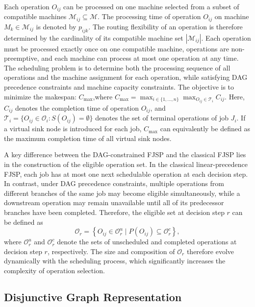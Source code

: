 Each operation $O_{ij}$ can be processed on one machine selected from a subset of compatible machines $\mathcal{M}_{ij}\subseteq\mathcal{M}$. The processing time of operation $O_{ij}$ on machine $M_k\in\mathcal{M}_{ij}$ is denoted by $p_{ijk}$. The routing flexibility of an operation is therefore determined by the cardinality of its compatible machine set $|\mathcal{M}_{ij}|$. Each operation must be processed exactly once on one compatible machine, operations are non-preemptive, and each machine can process at most one operation at any time.
The scheduling problem is to determine both the processing sequence of all operations and the machine assignment for each operation, while satisfying DAG precedence constraints and machine capacity constraints. The objective is to minimize the makespan: \(C_{\max}\),where \(C_{\max}=\max_{i\in\{1,\dots,n\}}\max_{O_{ij}\in\mathcal{T}_i} C_{ij}\). 
Here, $C_{ij}$ denotes the completion time of operation $O_{ij}$, and $\mathcal{T}_i=\{O_{ij}\in\mathcal{O}_i:S(O_{ij})=\emptyset\}$ denotes the set of terminal operations of job $J_i$. 
If a virtual sink node is introduced for each job, $C_{\max}$ can equivalently be defined as the maximum completion time of all virtual sink nodes.


A key difference between the DAG-constrained FJSP and the classical FJSP lies in the construction of the eligible operation set. In the classical linear-precedence FJSP, each job has at most one next schedulable operation at each decision step. In contrast, under DAG precedence constraints, multiple operations from different branches of the same job may become eligible simultaneously, while a downstream operation may remain unavailable until all of its predecessor branches have been completed. Therefore, the eligible set at decision step $r$ can be defined as
\begin{equation}
	\label{eq:eligible_set}
	\mathcal{O}_r=
	\left\{
	O_{ij}\in\mathcal{O}^{u}_r
	\mid
	P(O_{ij})\subseteq \mathcal{O}^{c}_r
	\right\},
\end{equation}
where $\mathcal{O}^{u}_r$ and $\mathcal{O}^{c}_r$ denote the sets of unscheduled and completed operations at decision step $r$, respectively. The size and composition of $\mathcal{O}_r$ therefore evolve dynamically with the scheduling process, which significantly increases the complexity of operation selection.


\subsection{Disjunctive Graph Representation}
\label{sec:disjunctive_graph}

